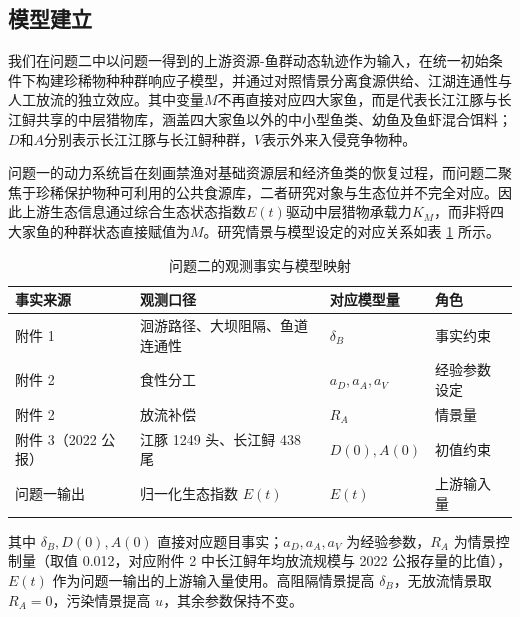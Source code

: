 \documentclass{MMCStyle}
\begin{document}
\subsection{模型建立}
我们在问题二中以问题一得到的上游资源-鱼群动态轨迹作为输入，在统一初始条件下构建珍稀物种种群响应子模型，并通过对照情景分离食源供给、江湖连通性与人工放流的独立效应。其中变量$M$不再直接对应四大家鱼，而是代表长江江豚与长江鲟共享的中层猎物库，涵盖四大家鱼以外的中小型鱼类、幼鱼及鱼虾混合饵料；$D$和$A$分别表示长江江豚与长江鲟种群，$V$表示外来入侵竞争物种。

问题一的动力系统旨在刻画禁渔对基础资源层和经济鱼类的恢复过程，而问题二聚焦于珍稀保护物种可利用的公共食源库，二者研究对象与生态位并不完全对应。因此上游生态信息通过综合生态状态指数$E(t)$驱动中层猎物承载力$K_M$，而非将四大家鱼的种群状态直接赋值为$M$。研究情景与模型设定的对应关系如表 \ref{tab:q2map} 所示。
\begin{table}[htbp]
\centering
\caption{问题二的观测事实与模型映射}
\label{tab:q2map}
\begin{tabularx}{0.95\textwidth}{>{\raggedright\arraybackslash}p{2.4cm} >{\raggedright\arraybackslash}p{4.2cm} >{\raggedright\arraybackslash}p{3.6cm} X}
\toprule
事实来源 & 观测口径 & 对应模型量 & 角色 \\
\midrule
附件 1 & 洄游路径、大坝阻隔、鱼道连通性 & $\delta_B$ & 事实约束 \\
附件 2 & 食性分工 & $a_D,a_A,a_V$ & 经验参数设定 \\
附件 2 & 放流补偿 & $R_A$ & 情景量 \\
附件 3（2022 公报） & 江豚 1249 头、长江鲟 438 尾 & $D(0),A(0)$ & 初值约束 \\
问题一输出 & 归一化生态指数 $E(t)$ & $E(t)$ & 上游输入量 \\
\bottomrule
\end{tabularx}
\end{table}
其中 $\delta_B,D(0),A(0)$ 直接对应题目事实；$a_D,a_A,a_V$ 为经验参数，$R_A$ 为情景控制量（取值 0.012，对应附件 2 中长江鲟年均放流规模与 2022 公报存量的比值），$E(t)$ 作为问题一输出的上游输入量使用。高阻隔情景提高 $\delta_B$，无放流情景取 $R_A=0$，污染情景提高 $u$，其余参数保持不变。
\end{document}
